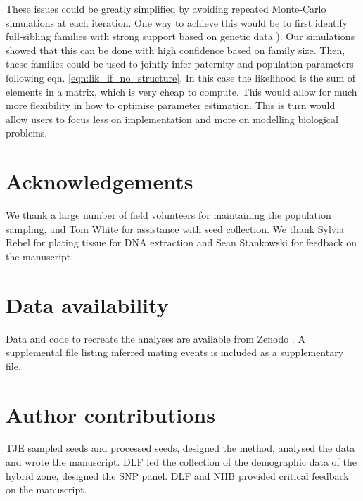 \documentclass[10pt, a4paper, twocolumn]{article} %
\begin{document}
These issues could be greatly simplified by avoiding repeated Monte-Carlo simulations at each iteration.
One way to achieve this would be to first identify full-sibling families with strong support based on genetic data \cite{ellis2018efficient}).
Our simulations showed that this can be done with high confidence based on family size.
Then, these families could be used to jointly infer paternity and population parameters following eqn. \ref{eqn:lik_if_no_structure}.
In this case the likelihood is the sum of elements in a matrix, which is very cheap to compute.
This would allow for much more flexibility in how to optimise parameter estimation.
This is turn would allow users to focus less on implementation and more on modelling biological problems.


\section{Acknowledgements}

We thank a large number of field volunteers for maintaining the population sampling, and Tom White for assistance with seed collection. We thank Sylvia Rebel for plating tissue for DNA extraction and Sean Stankowski for feedback on the manuscript.

\section{Data availability}

Data and code to recreate the analyses are available from Zenodo \citep{tom_ellis_2024_10565078}. A supplemental file listing inferred mating events is included as a supplementary file.

\section{Author contributions}

TJE sampled seeds and processed seeds, designed the method, analysed the data and wrote the manuscript.
DLF led the collection of the demographic data of the hybrid zone, designed the SNP panel.
DLF and NHB provided critical feedback on the manuscript. 

\printbibliography[title={Bibliography}] %
% 
\end{document}
